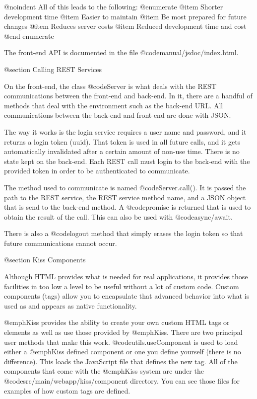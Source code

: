 @noindent
All of this leads to the following:
@enumerate
@item
Shorter development time
@item 
Easier to maintain
@item
Be most prepared for future changes
@item
Reduces server costs
@item
Reduced development time and cost
@end enumerate

The front-end API is documented in the file @code{manual/jsdoc/index.html}.



@section Calling REST Services

On the front-end, the class @code{Server} is what deals with the REST
communications between the front-end and back-end.  In it, there are a
handful of methods that deal with the environment such as the back-end
URL.  All communications between the back-end and front-end are done
with JSON.

The way it works is the login service requires a user name and
password, and it returns a login token (uuid).  That token is used in
all future calls, and it gets automatically invalidated after a certain
amount of non-use time.  There is no state kept on the back-end.  Each
REST call must login to the back-end with the provided token in order
to be authenticated to communicate.

The method used to communicate is named @code{Server.call()}. It is passed the
path to the REST service, the REST service method name, and a JSON
object that is send to the back-end method.  A @code{promise} is
returned that is used to obtain the result of the call.  This
can also be used with @code{async/await}.

There is also a @code{logout} method that simply erases the
login token so that future communications cannot occur.

@section Kiss Components


Although HTML provides what is needed for real applications, it
provides those facilities in too low a level to be useful without a
lot of custom code.  Custom components (tags) allow you to encapsulate
that advanced behavior into what is used as and appears as native
functionality.

@emph{Kiss} provides the ability to create your own custom HTML tags
or elements as well as use those provided by @emph{Kiss}.  There are
two principal user methods that make this work.
@code{utils.useComponent} is used to load either a @emph{Kiss} defined
component or one you define yourself (there is no difference).  This
loads the JavaScript file that defines the new tag.  All of the
components that come with the @emph{Kiss} system are under the
@code{src/main/webapp/kiss/component} directory.  You can see those
files for examples of how custom tags are defined.

